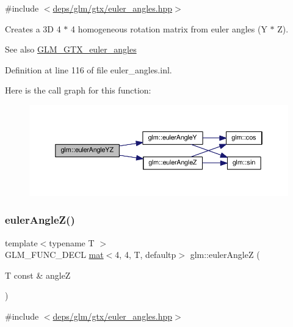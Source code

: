 {\ttfamily \#include $<$\hyperlink{euler__angles_8hpp}{deps/glm/gtx/euler\+\_\+angles.\+hpp}$>$}

Creates a 3D 4 $\ast$ 4 homogeneous rotation matrix from euler angles (Y $\ast$ Z). \begin{DoxySeeAlso}{See also}
\hyperlink{group__gtx__euler__angles}{G\+L\+M\+\_\+\+G\+T\+X\+\_\+euler\+\_\+angles} 
\end{DoxySeeAlso}


Definition at line 116 of file euler\+\_\+angles.\+inl.

Here is the call graph for this function\+:
\nopagebreak
\begin{figure}[H]
\begin{center}
\leavevmode
\includegraphics[width=350pt]{d2/d7e/group__gtx__euler__angles_ga220379e10ac8cca55e275f0c9018fed9_cgraph}
\end{center}
\end{figure}
\mbox{\label{group__gtx__euler__angles_ga5b3935248bb6c3ec6b0d9297d406e251}} 
\subsubsection{\texorpdfstring{euler\+Angle\+Z()}{eulerAngleZ()}}
{\footnotesize\ttfamily template$<$typename T $>$ \\
G\+L\+M\+\_\+\+F\+U\+N\+C\+\_\+\+D\+E\+CL \hyperlink{structglm_1_1mat}{mat}$<$4, 4, T, defaultp$>$ glm\+::euler\+AngleZ (\begin{DoxyParamCaption}\item[{T const \&}]{angleZ }\end{DoxyParamCaption})}



{\ttfamily \#include $<$\hyperlink{euler__angles_8hpp}{deps/glm/gtx/euler\+\_\+angles.\+hpp}$>$}

